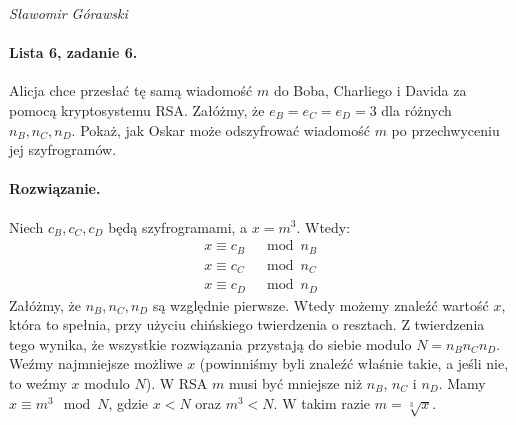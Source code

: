 \documentclass{article}
\begin{document}
\begin{flushright}
\textit{Sławomir Górawski}
\end{flushright}

\paragraph{Lista 6, zadanie 6.}
Alicja chce przesłać tę samą wiadomość $m$
do Boba, Charliego i Davida za pomocą kryptosystemu RSA.
Załóżmy, że $e_B = e_C = e_D = 3$ dla różnych $n_B, n_C, n_D$.
Pokaż, jak Oskar może odszyfrować
wiadomość $m$ po przechwyceniu jej szyfrogramów.

\paragraph{Rozwiązanie.}
Niech $c_B, c_C, c_D$ będą szyfrogramami, a $x = m^3$. Wtedy:
\begin{align*}
    x \equiv c_B &\mod n_B \\
    x \equiv c_C &\mod n_C \\
    x \equiv c_D &\mod n_D
\end{align*}
Załóżmy, że $n_B, n_C, n_D$ są względnie pierwsze.
Wtedy możemy znaleźć wartość $x$, która to spełnia,
przy użyciu chińskiego twierdzenia o resztach.
Z twierdzenia tego wynika,
że wszystkie rozwiązania przystają do siebie modulo $N = n_Bn_Cn_D$.
Weźmy najmniejsze możliwe $x$
(powinniśmy byli znaleźć właśnie takie, a jeśli nie, to weźmy $x$ modulo $N$).
W RSA $m$ musi być mniejsze niż $n_B$, $n_C$ i $n_D$.
Mamy $x \equiv m^3 \mod N$, gdzie $x < N$ oraz $m^3 < N$.
W takim razie $m = \sqrt[3]{x}$.
\end{document}
